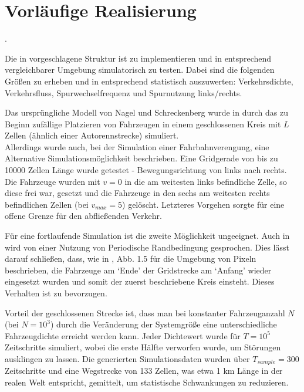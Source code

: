 \section{Vorläufige Realisierung}
\label{sec:realisierung}

.

Die in \cite{dat-ba} vorgeschlagene Struktur ist zu implementieren und in entsprechend vergleichbarer Umgebung simulatorisch zu testen. Dabei sind die folgenden Größen zu erheben und in entsprechend statistisch auszuwerten: Verkehrsdichte, Verkehrsfluss, Spurwechselfrequenz und Spurnutzung links/rechts.

Das ursprüngliche Modell von Nagel und Schreckenberg wurde in \cite{na-sch} durch das zu Beginn zufällige Platzieren von Fahrzeugen in einem geschlossenen Kreis mit $L$ Zellen (ähnlich einer Autorennstrecke) simuliert. \\
Allerdings wurde auch, bei der Simulation einer Fahrbahnverengung, eine Alternative Simulationsmöglichkeit beschrieben. 
Eine Gridgerade von bis zu 10000 Zellen Länge wurde getestet - Bewegungsrichtung von links nach rechts. 
Die Fahrzeuge wurden mit $v=0$ in die am weitesten links befindliche Zelle, so diese frei war, gesetzt und die Fahrzeuge in den sechs am weitesten rechts befindlichen Zellen (bei $v_{max}=5$) gelöscht. 
Letzteres Vorgehen sorgte für eine offene Grenze für den abfließenden Verkehr.

Für eine fortlaufende Simulation ist die zweite Möglichkeit ungeeignet. Auch in \cite{multi-lane} wird von einer Nutzung von Periodische Randbedingung gesprochen. 
Dies lässt darauf schließen, dass, wie in \cite{peri-rand}, Abb. 1.5 für die Umgebung von Pixeln beschrieben, die Fahrzeuge am \enquote*{Ende} der Gridstrecke am \enquote*{Anfang} wieder eingesetzt wurden und somit der zuerst beschriebene Kreis einsteht.
Dieses Verhalten ist zu bevorzugen.

Vorteil der geschlossenen Strecke ist, dass man bei konstanter Fahrzeuganzahl $N$ (bei \cite{multi-lane} $N = 10^{3}$) durch die Veränderung der Systemgröße eine unterschiedliche Fahrzeugdichte erreicht werden kann. 
Jeder Dichtewert wurde für $T = 10^{5}$ Zeitschritte simuliert, wobei die erste Hälfte verworfen wurde, um Störungen ausklingen zu lassen. 
Die generierten Simulationsdaten wurden über $T_{sample} = 300$ Zeitschritte und eine Wegstrecke von 133 Zellen, was etwa 1 km Länge in der realen Welt entspricht, gemittelt, um statistische Schwankungen zu reduzieren.


